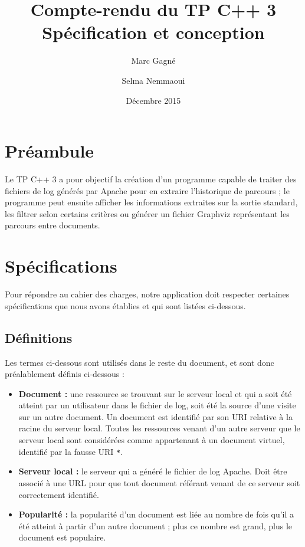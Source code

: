 \documentclass[11pt,a4paper]{article}
\begin{document}
\title{
	Compte-rendu du TP C++ 3\\
	Spécification et conception
}
\author{
	Marc Gagné\\
	\and
	Selma Nemmaoui
}
\date{Décembre 2015}
\maketitle

\section*{Préambule}
Le TP C++ 3 a pour objectif la création d'un programme capable de traiter des fichiers de log générés par Apache pour en extraire l'historique de parcours ; le programme peut ensuite afficher les informations extraites sur la sortie standard, les filtrer selon certains critères ou générer un fichier Graphviz représentant les parcours entre documents.

\section{Spécifications}

Pour répondre au cahier des charges, notre application doit respecter certaines spécifications que nous avons établies et qui sont listées ci-dessous.

\subsection{Définitions}
Les termes ci-dessous sont utilisés dans le reste du document, et sont donc préalablement définis ci-dessous :
\begin{itemize}
    \item \textbf{Document :} une ressource se trouvant sur le serveur local et qui a soit été atteint par un utilisateur dans le fichier de log, soit été la source d'une visite sur un autre document. Un document est identifié par son URI relative à la racine du serveur local. Toutes les ressources venant d'un autre serveur que le serveur local sont considérées comme appartenant à un document virtuel, identifié par la fausse URI \texttt{*}.
    \item \textbf{Serveur local :} le serveur qui a généré le fichier de log Apache. Doit être associé à une URL pour que tout document référant venant de ce serveur soit correctement identifié.
    \item \textbf{Popularité :} la popularité d'un document est liée au nombre de fois qu'il a été atteint à partir d'un autre document ; plus ce nombre est grand, plus le document est populaire.
\end{itemize}
\end{document}
